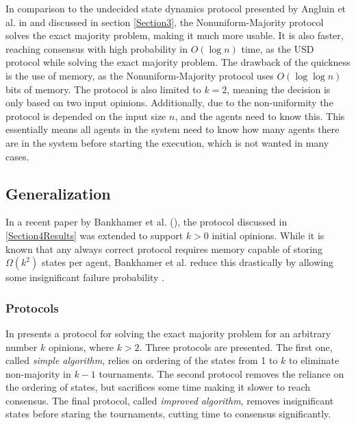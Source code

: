 In comparison to the undecided state dynamics protocol presented by Angluin et al. in \cite{angluinSimplePopulationProtocol2008} and discussed in section \ref{Section3}, the Nonuniform-Majority protocol solves the exact majority problem, making it much more usable. It is also faster, reaching consensus with high probability in $O(\log n)$ time, as the USD protocol while solving the exact majority problem. The drawback of the quickness is the use of memory, as the Nonuniform-Majority protocol uses $O(\log \log n)$ bits of memory.  The protocol is also limited to $k = 2$, meaning the decision is only based on two input opinions. 
Additionally, due to the non-uniformity the protocol is depended on the input size $n$, and the agents need to know this. This essentially means all agents in the system need to know how many agents there are in the system before starting the execution, which is not wanted in many cases. 


\subsection{Generalization}

In a recent paper by Bankhamer et al. (\cite{bankhamerPopulationProtocolsExact2022}), the protocol discussed in \ref{Section4Results} was extended to support $k > 0$ initial opinions.
While it is known that any always correct protocol requires memory capable of storing $\Omega(k^2)$ states per agent, Bankhamer et al. reduce this drastically by allowing some insignificant failure probability \cite{ongaroSearchUnderstandableConsensus}. 

\subsubsection{Protocols} \label{441}

In \cite{bankhamerPopulationProtocolsExact2022} presents a protocol for solving the exact majority problem for an arbitrary number $k$ opinions, where $k > 2$. Three protocols are presented. The first one, called \emph{simple algorithm}, relies on ordering of the states from 1 to $k$ to eliminate non-majority in $k-1$ tournaments. The second protocol removes the reliance on the ordering of states, but sacrifices some time making it slower to reach consensus. The final protocol, called \emph{improved algorithm}, removes insignificant states before staring the tournaments, cutting time to consensus significantly. 

